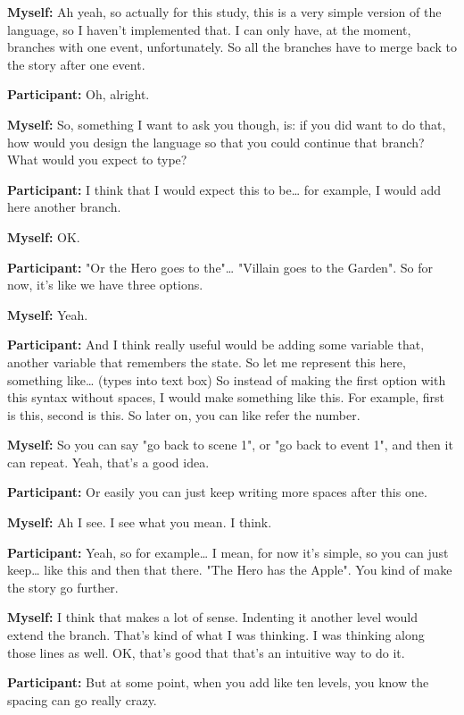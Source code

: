 \documentclass[11pt]{report}
\newcommand{\llabel}[1]{\hypertarget{llineno:#1}{\linelabel{#1}}}
\begin{document}
\begin{linenumbers}
\textbf{Myself:} Ah yeah, so actually for this study, this is a very simple version of the language, so I haven't implemented that. I can only have, at the moment, branches with one event, unfortunately. So all the branches have to merge back to the story after one event.

\textbf{Participant:} Oh, alright.

\textbf{Myself:} So, something I want to ask you though, is: if you did want to do that, how would you design the language so that you could continue that branch? What would you expect to type?

\textbf{Participant:} I think that I would expect this to be\ldots{} for example, I would add here another branch.

\textbf{Myself:} OK.

\textbf{Participant:} "Or the Hero goes to the"\ldots{} "Villain goes to the Garden". So for now, it's like we have three options.

\textbf{Myself:} Yeah.

\textbf{Participant:} And I think really useful would be adding some variable
that, another variable that remembers the state. So let me represent this here,
something like\ldots{} (types into text box) So instead of making the first
option with this syntax without spaces, I would make something like this. For
example, first is this, second is this. So later on, you can like refer the
number.\llabel{lne:feature2f}

\textbf{Myself:} So you can say "go back to scene 1", or "go back to event 1", and then it can repeat. Yeah, that's a good idea.

\textbf{Participant:} Or easily you can just keep writing more spaces after this one.

\textbf{Myself:} Ah I see. I see what you mean. I think.

\textbf{Participant:} Yeah, so for example\ldots{} I mean, for now it's simple, so you can just keep\ldots{} like this and then that there. "The Hero has the Apple". You kind of make the story go further.

\textbf{Myself:} I think that makes a lot of sense. Indenting it another level would extend the branch. That's kind of what I was thinking. I was thinking along those lines as well. OK, that's good that that's an intuitive way to do it.

\textbf{Participant:} But at some point, when you add like ten levels, you know the spacing can go really crazy.


\end{linenumbers}
\end{document}
